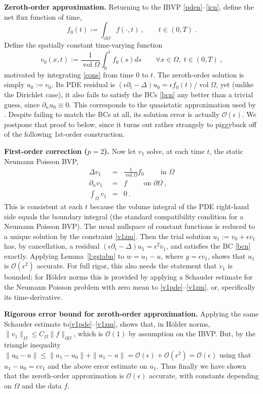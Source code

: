 \documentclass[10pt]{article}
\newcommand{\be}{\begin{equation}}
\newcommand{\ee}{\end{equation}}
\newcommand{\bea}{\begin{eqnarray}}
\newcommand{\eea}{\end{eqnarray}}
\newcommand{\bigO}{{\mathcal O}}
\DeclareMathOperator{\vol}{vol}
\newcommand{\pO}{{\partial\Omega}}
\newcommand{\eps}{\epsilon}
\newcommand{\dn}{\partial_n}
\newcommand{\dt}{\partial_t}
\begin{document}
{\bf Zeroth-order approximation.}
Returning to the IBVP \eqref{pden}--\eqref{icn},
define the net flux function of time,
\be
f_0(t) := \int_\pO f(\cdot,t)~, \qquad t\in(0,T)~.
\label{f0}
\ee
Define the spatially constant time-varying function
\be
v_0(x,t) := \frac{1}{\vol\Omega} \int_0^t f_0(s) ds
\qquad \forall x \in \Omega, \; t\in(0,T)~,
\ee
motivated by integrating \eqref{cons} from time 0 to $t$.
The zeroth-order solution is simply $u_0:=v_0$.
Its PDE residual is $(\eps \dt -\Delta)u_0 = \eps f_0(t) / \vol \Omega$,
yet (unlike the Dirichlet case), it also fails to satisfy the BCs \eqref{bcn}
any better than a trivial guess, since $\dn u_0 \equiv 0$.
This corresponds to the quasistatic approximation used by \cite{diegmiller18}.
Despite failing to match the BCs at all, its solution error is actually $\bigO(\eps)$.
We postpone that proof to below, since it turns out rather strangely to
piggyback off of the following 1st-order construction.

{\bf First-order correction ($p=2$).}
Now let $v_1$ solve, at each time $t$, the static Neumann Poisson BVP,
\bea
\Delta v_1 &=& \frac{1}{\vol\Omega} f_0 \qquad \mbox{ in } \Omega
\label{v1pde}
\\
\dn v_1 &=& f \qquad \mbox{ on } \pO~,
\\
\int_\Omega v_1 &=& 0~.
\label{v1zm}
\eea
This is consistent at each $t$ because the volume integral of the PDE
right-hand side equals the boundary integral
(the standard compatibility condition for a Neumann Poisson BVP).
The usual nullspace of constant functions is reduced to a unique solution
by the constraint \eqref{v1zm}.
Then the trial solution
$u_1 := v_0 + \eps v_1$
has, by cancellation, a residual $(\eps \dt -\Delta)u_1 = \eps^2 \dot v_1$,
and satisfies the BC \eqref{bcn} exactly.
Applying Lemma~\ref{l:gstabn} to $w=u_1 -u$, where $g=\eps \dot v_1$,
shows that $u_1$ is $\bigO(\eps^2)$ accurate.
For full rigor, this also needs the statement that $\dot v_1$ is
bounded; for H\"older norms this is provided by applying
a Schauder estimate \cite{nardi15} for the Neumann Poisson problem
with zero mean to \eqref{v1pde}--\eqref{v1zm}, or, specifically
its time-derivative.

{\bf Rigorous error bound for zeroth-order approximation.}
Applying the same Schauder estimate \cite{nardi15}
to\eqref{v1pde}--\eqref{v1zm}, shows that,
in H\"older norms,
$\|v_1\|_\Omega \le C_\Omega \|f\|_\pO$,
which is $\bigO(1)$ by assumption on the IBVP.
But, by the triangle inequality $\|u_0-u\| \le \|u_1-u_0\| + \|u_1-u\|
=\bigO(\eps) + \bigO(\eps^2) = \bigO(\eps)$
using that $u_1-u_0 = \eps v_1$ and the above error estimate
on $u_1$.
Thus finally we have shown that the zeroth-order approximation
is $\bigO(\eps)$ accurate, with constants depending on $\Omega$ and the
data $f$.
\end{document}
